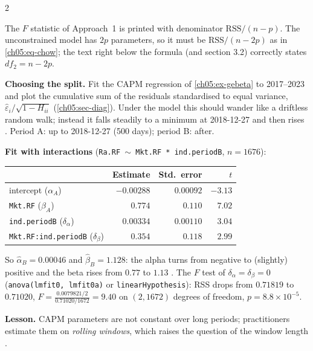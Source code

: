 \begin{paracol}{2}
\begin{coursenote}
The $F$ statistic of Approach~1 is printed with denominator $\text{RSS}/(n-p)$. The unconstrained model has $2p$ parameters,
so it must be $\text{RSS}/(n-2p)$ as in \eqref{ch05:eq-chow}; the text right below the formula (and section 3.2) correctly
states $df_2=n-2p$.
\end{coursenote}

\begin{casestudy}
\textbf{Choosing the split.} Fit the CAPM regression of \cref{ch05:ex-gebeta} to 2017--2023 and plot the cumulative
sum of the residuals standardised to equal variance, $\hat\varepsilon_i/\sqrt{1-H_{ii}}$ (\cref{ch05:sec-diag}). Under the model
this should wander like a driftless random walk; instead it falls steadily to a minimum at 2018-12-27 and then
rises . Period A: up to 2018-12-27 (500 days); period B: after.

\textbf{Fit with interactions} (\texttt{Ra.RF $\sim$ Mkt.RF * ind.periodB}, $n=1676$):

\smallskip
\centering\small
\begin{tabular}{@{}lrrr@{}}
\toprule
 & Estimate & Std.\ error & $t$\\
\midrule
intercept ($\alpha_A$) & $-0.00288$ & $0.00092$ & $-3.13$\\
\texttt{Mkt.RF} ($\beta_A$) & $0.774$ & $0.110$ & $7.02$\\
\texttt{ind.periodB} ($\delta_\alpha$) & $0.00334$ & $0.00110$ & $3.04$\\
\texttt{Mkt.RF:ind.periodB} ($\delta_\beta$) & $0.354$ & $0.118$ & $2.99$\\
\bottomrule
\end{tabular}

\smallskip
\raggedright
So $\hat\alpha_B=0.00046$ and $\hat\beta_B=1.128$: the alpha turns from negative to (slightly) positive and the beta rises
from $0.77$ to $1.13$ . The $F$ test of $\delta_\alpha=\delta_\beta=0$ (\texttt{anova(lmfit0, lmfit0a)} or
\texttt{linearHypothesis}): RSS drops from $0.71819$ to $0.71020$,
$F=\frac{0.0079821/2}{0.71020/1672}=9.40$ on $(2,1672)$ degrees of freedom, $p=8.8\times10^{-5}$.

\textbf{Lesson.} CAPM parameters are not constant over long periods; practitioners estimate them on
\emph{rolling windows}, which raises the question of the window length .
\end{casestudy}


\end{paracol}
